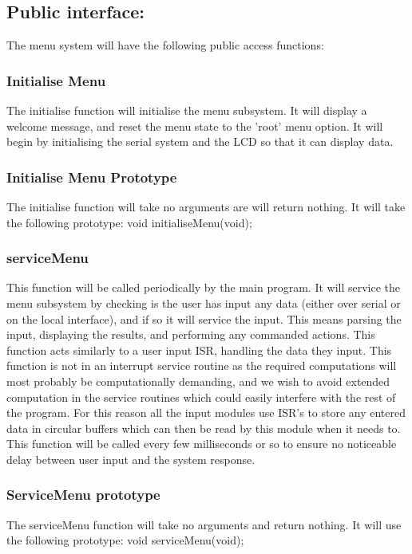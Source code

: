 \documentclass[]{article}
\begin{document}
\subsection{Public interface:}
The menu system will have the following public access functions:

\subsubsection{Initialise Menu}
The initialise function will initialise the menu subsystem. It will display a welcome message, and reset the menu state to the 'root' menu option. It will begin by initialising the serial system and the LCD so that it can display data.

\subsubsection{Initialise Menu Prototype}
The initialise function will take no arguments are will return nothing. It will take the following prototype: \newline \newline
void initialiseMenu(void);

\subsubsection{serviceMenu}
This function will be called periodically by the main program. It will service the menu subsystem by checking is the user has input any data (either over serial or on the local interface), and if so it will service the input. This means parsing the input, displaying the results, and performing any commanded actions. \newline
This function acts similarly to a user input ISR, handling the data they input. This function is not in an interrupt service routine as the required computations will most probably be computationally demanding, and we wish to avoid extended computation in the service routines which could easily interfere with the rest of the program. For this reason all the input modules use ISR's to store any entered data in circular buffers which can then be read by this module when it needs to. \newline
This function will be called every few milliseconds or so to ensure no noticeable delay between user input and the system response.

\subsubsection{ServiceMenu prototype}
The serviceMenu function will take no arguments and return nothing. It will use the following prototype: \newline \newline
void serviceMenu(void);
\end{document}
